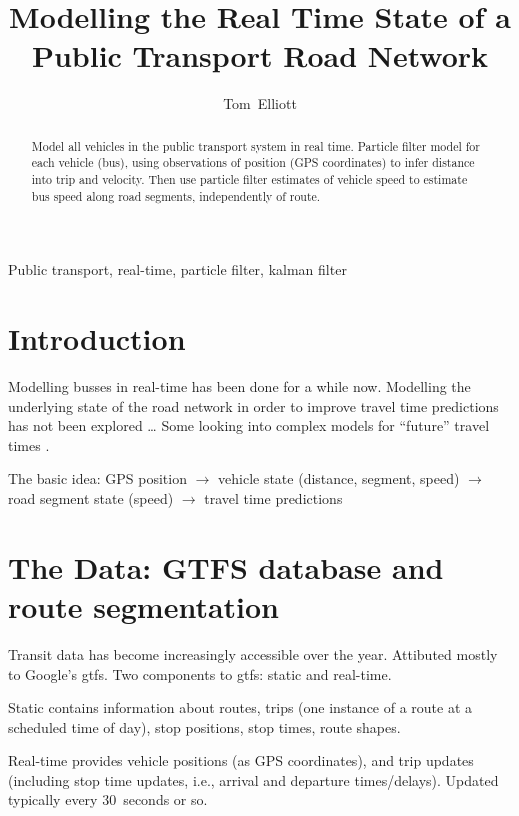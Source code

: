 \documentclass{IEEEtran}\usepackage[]{graphicx}\usepackage[]{color}
\title{Modelling the Real Time State of a Public Transport Road Network}
\author{Tom~Elliott}
\begin{document}
\maketitle


\begin{abstract}
  Model all vehicles in the public transport system in real time.
  Particle filter model for each vehicle (bus),
  using observations of position (GPS coordinates) to infer distance into trip
  and velocity.
  Then use particle filter estimates of vehicle speed to estimate bus speed along
  road segments, independently of route.
  
\end{abstract}

\begin{IEEEkeywords}
  Public transport, real-time, particle filter, kalman filter
\end{IEEEkeywords}


\section{Introduction}
\label{sec:intro}


Modelling busses in real-time has been done for a while now.
Modelling the underlying state of the road network in order to improve 
travel time predictions has not been explored \ldots
Some looking into complex models for ``future'' travel times \cite{Julio2016}.


The basic idea:
GPS position $\rightarrow$ 
vehicle state (distance, segment, speed) $\rightarrow$
road segment state (speed) $\rightarrow$
travel time predictions



\section{The Data: GTFS database and route segmentation}
\label{sec:data}

Transit data has become increasingly accessible over the year.
Attibuted mostly to Google's \gls{gtfs}.
Two components to \gls{gtfs}: static and real-time.

Static contains information about routes, trips (one instance of a route at a scheduled time of day),
stop positions, stop times, route shapes.

Real-time provides vehicle positions (as GPS coordinates),
and trip updates (including stop time updates, i.e., arrival and departure times/delays).
Updated typically every 30~seconds or so.
\end{document}

